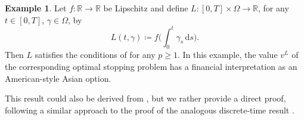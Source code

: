 \documentclass[onseside, final]{amsart}
\theoremstyle{definition}
\newtheorem{example}[theorem]{Example}
\newcommand{\R}{\mathbb R}
\newcommand{\D}{\,\mathrm{d}}
\numberwithin{equation}{section}
\begin{document}
		\begin{example}\label{ex:os-lip}
			Let $f \colon \R \to \R$ be Lipschitz and define $L \colon [0, T] \times \Omega \to \R$, for any $t \in [0, T]$, $\gamma \in \Omega$,  by
			\begin{equation}
				L(t, \gamma) \coloneqq f\Big(\int_0^t \gamma_s \D s\Big).
			\end{equation}
			Then $L$ satisfies the conditions of  for any $p \geq 1$. In this example, the value $v^L$ of the corresponding optimal stopping problem has a financial interpretation as an American-style Asian option.
		\end{example}
		
		This result could also be derived from \citep[Proposition 4.4]{AcBaZa20}, but we rather provide a direct proof, following a similar approach to the proof of the analogous discrete-time result \cite[Lemma 7.1]{BaBaBeEd19b}.
		
\end{document}
